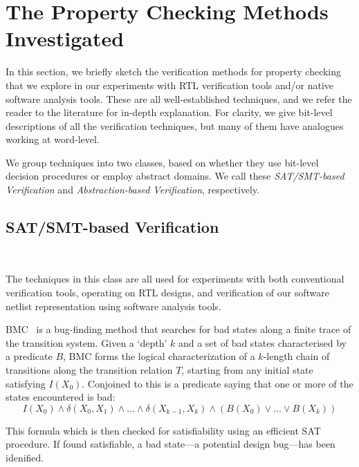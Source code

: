 \section{The Property Checking Methods Investigated}\label{sec:techniques}

In this section, we briefly sketch the verification methods for property checking that
we explore in our experiments with RTL verification tools and/or
native software analysis tools. These are all well-established techniques, 
and we refer the reader to the literature for in-depth explanation.
For clarity, we give bit-level descriptions of all 
the verification techniques, but many of them have analogues working at
word-level.

We group techniques into two classes, based on whether 
they use bit-level decision procedures or employ abstract domains. We call these 
\textit{SAT/SMT-based Verification} and \textit{Abstraction-based Verification}, 
respectively.

\subsection{SAT/SMT-based Verification}~\label{netlist-verif}

The techniques in this class are all used for experiments with both conventional verification tools,
operating on RTL designs, and verification of  our software netlist representation using software analysis tools.

%
BMC~\cite{biere} is a bug-finding method that searches for bad states along a finite trace of 
the transition system. Given a `depth' $k$ and a set of bad states characterised by a predicate
$B$, BMC forms the logical characterization of a $k$-length chain of transitions along the 
transition relation $T$,  starting from any initial state satisfying $I(X_0)$. 
Conjoined to this is a predicate saying that one or more of the states encountered 
is bad:
%
\[ I(X_0) \wedge \delta(X_0, X_1) \wedge \dots 
   \wedge \delta(X_{k{-}1}, X_k) \wedge (B(X_0) \vee \dots \vee B(X_k)) \]

\noindent This formula which is then checked for satisfiability using an efficient SAT procedure.
If found satisfiable, a bad state---a potential design bug---has been idenified.

